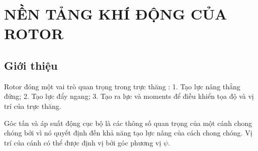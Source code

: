 \documentclass[TRUC_THANG.tex]{subfiles}
\begin{document}
\chapter{NỀN TẢNG KHÍ ĐỘNG CỦA ROTOR}
\section{Giới thiệu}
Rotor đóng một vai trò quan trọng trong trực thăng : 1. Tạo lực nâng thẳng đứng; 2. Tạo lực đẩy ngang; 3. Tạo ra lực và moments để điều khiển tọa độ và vị trí của trực thăng.

Góc tấn và áp suất động cục bộ là các thông số quan trọng của một cánh chong chóng bởi vì nó quyết định đến khả năng tạo lực nâng của cách chong chóng. Vị trí của cánh có thể được định vị bởi góc phương vị $\psi$.
\end{document}
